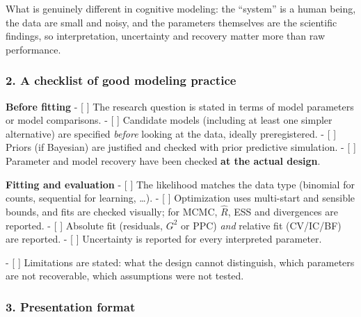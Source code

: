 What is genuinely different in cognitive modeling: the ``system'' is a
human being, the data are small and noisy, and the parameters themselves
are the scientific findings, so interpretation, uncertainty and recovery
matter more than raw performance.

\subsubsection{2. A checklist of good modeling practice}

\textbf{Before fitting} - {[} {]} The research question is stated in
terms of model parameters or model comparisons. - {[} {]} Candidate
models (including at least one simpler alternative) are specified
\emph{before} looking at the data, ideally preregistered. - {[} {]}
Priors (if Bayesian) are justified and checked with prior predictive
simulation. - {[} {]} Parameter and model recovery have been checked
\textbf{at the actual design}.

\textbf{Fitting and evaluation} - {[} {]} The likelihood matches the
data type (binomial for counts, sequential for learning, \ldots). - {[}
{]} Optimization uses multi-start and sensible bounds, and fits are
checked visually; for MCMC, \(\hat R\), ESS and divergences are
reported. - {[} {]} Absolute fit (residuals, \(G^2\) or PPC) \emph{and}
relative fit (CV/IC/BF) are reported. - {[} {]} Uncertainty is reported
for every interpreted parameter.

- {[} {]} Limitations are stated: what the design cannot distinguish,
which parameters are not recoverable, which assumptions were not tested.

\subsubsection{3. Presentation format}

